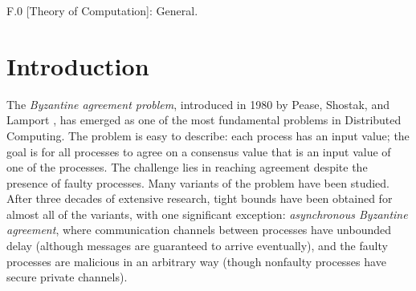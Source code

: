 \documentclass{sig-alternate}
\begin{document}
F.0 {[Theory of Computation]}: {General}.


\section{Introduction}
The \emph{Byzantine agreement problem}, introduced in 1980 by Pease,
Shostak, and Lamport \citeyear{PSL80}, has emerged as one of the most
fundamental problems in Distributed Computing. The problem is easy to
describe:
each process has an input value; the goal is for
all processes to agree on a
consensus value that is an input value of one of the processes. The
challenge lies in reaching agreement despite the presence of faulty
processes. Many variants of the problem have been studied.  After three
decades of
extensive research, tight bounds have been obtained for almost all of
the variants, with one significant exception:
\emph{asynchronous Byzantine agreement}, where communication channels
between processes have unbounded delay
(although messages are guaranteed to arrive eventually),
and the faulty processes are
malicious in an arbitrary way
(though nonfaulty processes have secure private channels).
\end{document}
